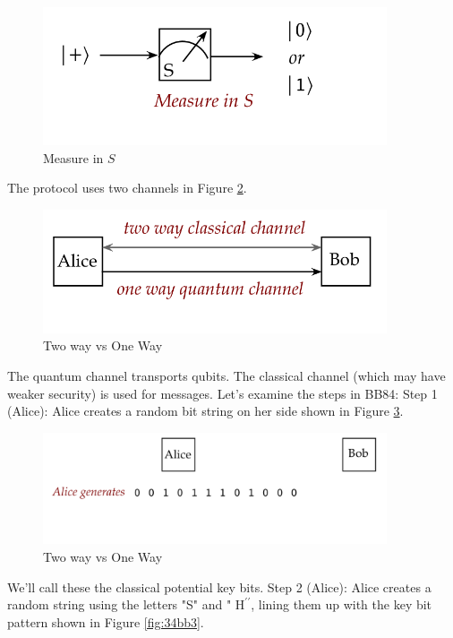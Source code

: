 \documentclass[main.tex]{subfiles}
\begin{document}
    \begin{figure}
        \centering
        \includegraphics[width=4in]{notes/figs/n05/31gate5.png}
        \caption{Measure in $S$}
        \label{fig:31gate5}
    \end{figure}
    
    The protocol uses two channels in Figure \ref{fig:32bb}.

    \begin{figure}
        \centering
        \includegraphics[width=4in]{notes/figs/n05/32bb.png}
        \caption{Two way vs One Way}
        \label{fig:32bb}
    \end{figure}
    
    The quantum channel transports qubits. The classical channel (which may have weaker security) is used for messages. Let's examine the steps in BB84: Step 1 (Alice): Alice creates a random bit string on her side shown in Figure \ref{fig:33bb2}.
    
    \begin{figure}
        \centering
        \includegraphics[width=4in]{notes/figs/n05/33bb2.png}
        \caption{Two way vs One Way}
        \label{fig:33bb2}
    \end{figure}
    
    We'll call these the classical potential key bits. Step 2 (Alice): Alice creates a random string using the letters "S" and " $\mathrm{H}^{\prime \prime}$, lining them up with the key bit pattern shown in Figure \ref{fig:34bb3}.
    
\end{document}

